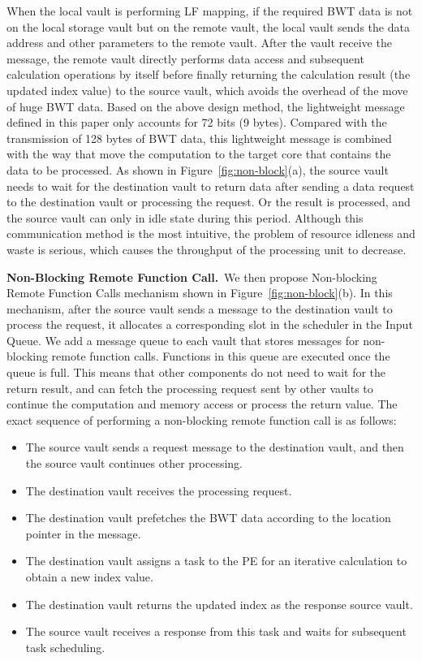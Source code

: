 \documentclass[9pt,conference]{IEEEtran}
\begin{document}
When the local vault is performing LF mapping, if the required BWT data is not on the local storage vault but on the remote vault, the local vault sends the data address and other parameters to the remote vault. After the vault receive the message, the remote vault directly performs data access and subsequent calculation operations by itself before finally returning the calculation result (the updated index value) to the source vault, which avoids the overhead of the move of huge BWT data. Based on the above design method, the lightweight message defined in this paper only accounts for 72 bits (9 bytes). Compared with the transmission of 128 bytes of BWT data, this lightweight message is combined with the way that move the computation to the target core that contains the data to be processed. As shown in Figure~\ref{fig:non-block}(a), the source vault needs to wait for the destination vault to return data after sending a data request to the destination vault or processing the request. Or the result is processed, and the source vault can only in idle state during this period. Although this communication method is the most intuitive, the problem of resource idleness and waste is serious, which causes the throughput of the processing unit to decrease.

\textbf{Non-Blocking Remote Function Call.}~We then propose Non-blocking Remote Function Calls mechanism shown in Figure~\ref{fig:non-block}(b). In this mechanism, after the source vault sends a message to the destination vault to process the request, it allocates a corresponding slot in the scheduler in the Input Queue. We add a message queue to each vault that stores messages for non-blocking remote function calls. Functions in this queue are executed once the queue is full. This means that other components do not need to wait for the return result, and can fetch the processing request sent by other vaults to continue the computation and memory access or process the return value. The exact sequence of performing a non-blocking remote function call is as follows:

\begin{itemize}
    \item The source vault sends a request message to the destination vault, and then the source vault continues other processing.
    
    \item The destination vault receives the processing request.
    
    \item The destination vault prefetches the BWT data according to the location pointer in the message.
    
    \item The destination vault assigns a task to the PE for an iterative calculation to obtain a new index value.
    
    \item The destination vault returns the updated index as the response source vault.
    
    \item The source vault receives a response from this task and waits for subsequent task scheduling.
\end{itemize}
\end{document}

